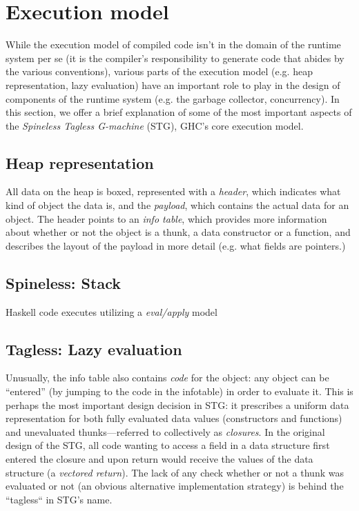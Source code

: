 \section{Execution model}

While the execution model of compiled code isn't in the domain of the
runtime system per se (it is the compiler's responsibility to generate
code that abides by the various conventions), various parts of the
execution model (e.g. heap representation, lazy evaluation) have an important
role to play in the design of components of the runtime system (e.g. the
garbage collector, concurrency).  In this section, we offer a brief
explanation of some of the most important aspects of the \emph{Spineless Tagless G-machine} (STG),
GHC's core execution model.

\subsection{Heap representation}

All data on the heap is boxed, represented with a \emph{header}, which
indicates what kind of object the data is, and the \emph{payload}, which
contains the actual data for an object.  The header points to an
\emph{info table}, which provides more information about whether or not
the object is a thunk, a data constructor or a function, and describes
the layout of the payload in more detail (e.g. what fields are
pointers.) 

\subsection{Spineless: Stack}


Haskell code executes utilizing a \emph{eval/apply} model

\subsection{Tagless: Lazy evaluation}

Unusually, the info table also contains \emph{code} for the object: any
object can be ``entered'' (by jumping to the code in the infotable) in
order to evaluate it.  This is perhaps the most important design
decision in STG: it prescribes a uniform data representation for both
fully evaluated data values (constructors and functions) and unevaluated
thunks---referred to collectively as \emph{closures}.  In the original
design of the STG, all code wanting to access a field in a data
structure first entered the closure and upon return would receive the
values of the data structure (a \emph{vectored return}).  The lack of
any check whether or not a thunk was evaluated or not (an obvious
alternative implementation strategy) is behind the ``tagless`` in STG's
name.

